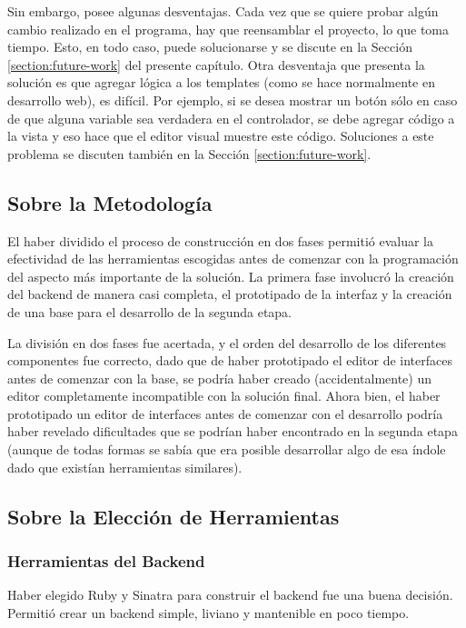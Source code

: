 \documentclass[12pt,titlepage,]{article}
\begin{document}
Sin embargo, posee algunas desventajas. Cada vez que se quiere probar
algún cambio realizado en el programa, hay que reensamblar el proyecto,
lo que toma tiempo. Esto, en todo caso, puede solucionarse y se discute
en la Sección \ref{section:future-work} del presente capítulo. Otra
desventaja que presenta la solución es que agregar lógica a los
templates (como se hace normalmente en desarrollo web), es difícil. Por
ejemplo, si se desea mostrar un botón sólo en caso de que alguna
variable sea verdadera en el controlador, se debe agregar código a la
vista y eso hace que el editor visual muestre este código. Soluciones a
este problema se discuten también en la Sección
\ref{section:future-work}.

\subsection{Sobre la Metodología}

El haber dividido el proceso de construcción en dos fases permitió
evaluar la efectividad de las herramientas escogidas antes de comenzar
con la programación del aspecto más importante de la solución. La
primera fase involucró la creación del backend de manera casi completa,
el prototipado de la interfaz y la creación de una base para el
desarrollo de la segunda etapa.

La división en dos fases fue acertada, y el orden del desarrollo de los
diferentes componentes fue correcto, dado que de haber prototipado el
editor de interfaces antes de comenzar con la base, se podría haber
creado (accidentalmente) un editor completamente incompatible con la
solución final. Ahora bien, el haber prototipado un editor de interfaces
antes de comenzar con el desarrollo podría haber revelado dificultades
que se podrían haber encontrado en la segunda etapa (aunque de todas
formas se sabía que era posible desarrollar algo de esa índole dado que
existían herramientas similares).

\subsection{Sobre la Elección de Herramientas}

\subsubsection{Herramientas del Backend}

Haber elegido Ruby y Sinatra para construir el backend fue una buena
decisión. Permitió crear un backend simple, liviano y mantenible en poco
tiempo.
\end{document}
